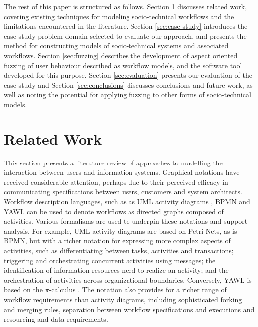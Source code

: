 \documentclass{llncs}
\newcommand{\picalc}{\(\pi\)-calculus }
\begin{document}
The rest of this paper is structured as follows.  Section \ref{sec:related} discusses related work, covering existing
techniques for modeling socio-technical workflows and the limitations
encountered in the literature.  Section \ref{sec:case-study} introduces the case study problem domain selected to
evaluate our approach, and presents the method for constructing models of socio-technical systems and associated
workflows. Section \ref{sec:fuzzing} describes the development of aspect oriented fuzzing of user behaviour described as
workflow models, and the software tool developed for this purpose.  Section \ref{sec:evaluation} presents our evaluation
of the case study and Section \ref{sec:conclusions} discusses conclusions and future work, as well as noting the
potential for applying fuzzing to other forms of socio-technical models.


\section{Related Work}
\label{sec:related}


This section presents a literature review of approaches to modelling the interaction between users and information
systems.  Graphical notations have received considerable attention, perhaps due to their perceived efficacy in
communicating specifications between users, customers and system architects.  Workflow description languages, such as as
UML activity diagrams \citep{omg07omguml}, BPMN \citep{omg2011omgbpmn} and YAWL \citep{hofstede2010yawl} can be used to
denote workflows as directed graphs composed of activities.  Various formalisms are used to underpin these notations and
support analysis.  For example, UML activity diagrams are based on Petri
Nets, as is BPMN, but with a richer notation
for expressing more complex aspects of activities, such as differentiating between tasks, activities and transactions;
triggering and orchestrating concurrent activities using messages; the identification of information resources need to
realize an activity; and the orchestration of activities across organizational boundaries.  Conversely, YAWL is based on
the \picalc \citep{aalst2004workflow}.  The notation also provides for a richer range of workflow requirements than
activity diagrams, including sophisticated forking and merging rules, separation between workflow specifications and
executions and resourcing and data requirements.
\end{document}

